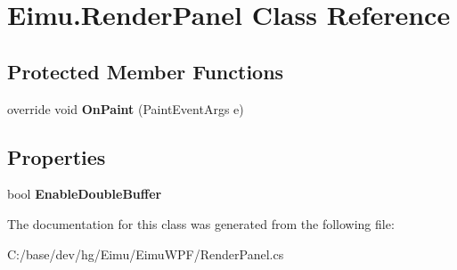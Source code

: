 \hypertarget{class_eimu_1_1_render_panel}{
\section{Eimu.RenderPanel Class Reference}
\label{class_eimu_1_1_render_panel}
}
\subsection*{Protected Member Functions}
\begin{DoxyCompactItemize}
\item 
\hypertarget{class_eimu_1_1_render_panel_ac5a31faac41ead94c3e659673f496ab3}{
override void {\bfseries OnPaint} (PaintEventArgs e)}
\label{class_eimu_1_1_render_panel_ac5a31faac41ead94c3e659673f496ab3}

\end{DoxyCompactItemize}
\subsection*{Properties}
\begin{DoxyCompactItemize}
\item 
\hypertarget{class_eimu_1_1_render_panel_ad772742be91f962df327ed0d3d0bc828}{
bool {\bfseries EnableDoubleBuffer}}
\label{class_eimu_1_1_render_panel_ad772742be91f962df327ed0d3d0bc828}

\end{DoxyCompactItemize}


The documentation for this class was generated from the following file:\begin{DoxyCompactItemize}
\item 
C:/base/dev/hg/Eimu/EimuWPF/RenderPanel.cs\end{DoxyCompactItemize}
